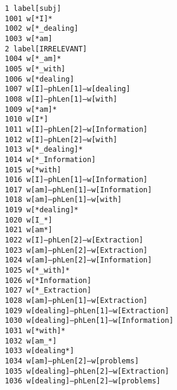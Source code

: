 \documentclass[11pt]{article}
\begin{document}
{\tt 1       label[subj] \\
1001    w[*I]* \\
1002    w[*\_dealing] \\
1003    w[*am] \\
2       label[IRRELEVANT] \\
1004    w[*\_am]* \\
1005    w[*\_with] \\
1006    w[*dealing] \\
1007    w[I]--phLen[1]--w[dealing] \\
1008    w[I]--phLen[1]--w[with] \\
1009    w[*am]* \\
1010    w[I*] \\
1011    w[I]--phLen[2]--w[Information] \\
1012    w[I]--phLen[2]--w[with] \\
1013    w[*\_dealing]* \\
1014    w[*\_Information] \\
1015    w[*with] \\
1016    w[I]--phLen[1]--w[Information] \\
1017    w[am]--phLen[1]--w[Information] \\
1018    w[am]--phLen[1]--w[with] \\
1019    w[*dealing]* \\
1020    w[I\_*] \\
1021    w[am*] \\
1022    w[I]--phLen[2]--w[Extraction] \\
1023    w[am]--phLen[2]--w[Extraction] \\
1024    w[am]--phLen[2]--w[Information] \\
1025    w[*\_with]* \\
1026    w[*Information] \\
1027    w[*\_Extraction] \\
1028    w[am]--phLen[1]--w[Extraction] \\
1029    w[dealing]--phLen[1]--w[Extraction] \\
1030    w[dealing]--phLen[1]--w[Information] \\
1031    w[*with]* \\
1032    w[am\_*] \\
1033    w[dealing*] \\
1034    w[am]--phLen[2]--w[problems] \\
1035    w[dealing]--phLen[2]--w[Extraction] \\
1036    w[dealing]--phLen[2]--w[problems] \\
}
\end{document}
